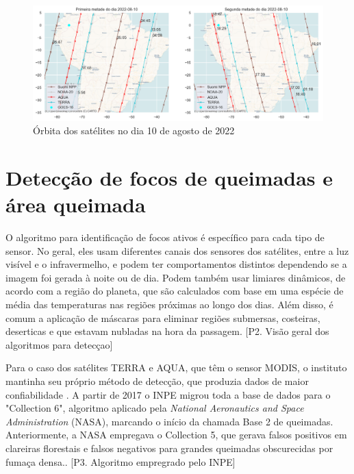 \documentclass[cic,tc]{iiufrgs}
\begin{document}
\begin{figure}[H]
    \caption{Órbita dos satélites no dia 10 de agosto de 2022}
    \begin{center}
        \includegraphics[width=35em]{orbita2022-08-10}
    \end{center}
    \label{fig:orbita2022-08-10}
\end{figure}

\section{Detecção de focos de queimadas e área queimada}

O algoritmo para identificação de focos ativos é específico para cada tipo de sensor. No geral, eles usam diferentes canais dos sensores dos satélites, entre a luz visível e o infravermelho, e podem ter comportamentos distintos dependendo se a imagem foi gerada à noite ou de dia. Podem também usar limiares dinâmicos, de acordo com a região do planeta, que são calculados com base em uma espécie de média das temperaturas nas regiões próximas ao longo dos dias. Além disso, é comum a aplicação de máscaras para eliminar regiões submersas, costeiras, deserticas e que estavam nubladas na hora da passagem. [P2. Visão geral dos algoritmos para detecçao] \par

Para o caso dos satélites TERRA e AQUA, que têm o sensor MODIS, o instituto mantinha seu próprio método de detecção, que produzia dados de maior confiabilidade \citep{PerguntasFrequentesINPE}. A partir de 2017 o INPE migrou toda a base de dados para o "Collection 6", algoritmo aplicado pela \textit{National Aeronautics and Space Administration} (NASA), marcando o início da chamada Base 2 de queimadas. Anteriormente, a NASA empregava o Collection 5, que gerava falsos positivos em clareiras florestais e falsos negativos para grandes queimadas obscurecidas por fumaça densa.\citep{SCHROEDER2008}. [P3. Algoritmo empregrado pelo INPE] \par
\end{document}
